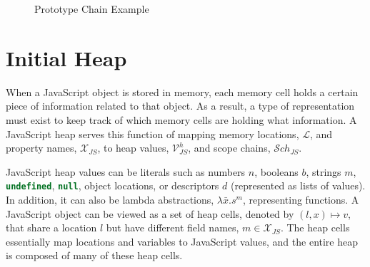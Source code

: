 \documentclass[a4paper,11pt,twoside]{report}
\def\jsinline{\lstinline[language=JavaScript, basicstyle=\small]}%\end{lstlisting}
\begin{document}
\begin{figure}[!h]
\begin{center}
\caption{Prototype Chain Example}
\vspace*{-0.5cm}
\label{fig:initheap}
\end{center}
\end{figure}



\section{Initial Heap}\label{sec:jsheap}
When a JavaScript object is stored in memory, each memory cell holds a certain piece of information related to that object. As a result, a type of representation must exist to keep track of which memory cells are holding what information. A JavaScript heap serves this function of mapping memory locations, $\mathcal{L}$, and property names, $\mathcal{X}_{JS}$, to heap values, $\mathcal{V}_{JS}^h$, and scope chains, $\mathcal{S}ch_{JS}$. 

JavaScript heap values can be literals such as numbers $n$, booleans $b$, strings $m$, \jsinline|undefined|, \jsinline|null|, object locations, or descriptors $d$ (represented as lists of values). In addition, it can also be lambda abstractions, $\lambda \bar{x}.s^m$, representing functions. A JavaScript object can be viewed as a set of heap cells, denoted by $(l, x) \mapsto v$, that share a location $l$ but have different field names, $m \in \mathcal{X}_{JS}$. The heap cells essentially map locations and variables to JavaScript values, and the entire heap is composed of many of these heap cells. 
\end{document}
